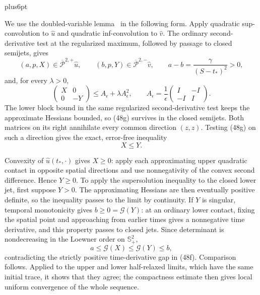 \documentclass[11pt,reqno]{amsart}
\makeatletter
\theoremstyle{plain}
\theoremstyle{definition}
\theoremstyle{remark}
\renewenvironment{proof}[1][\proofname]{%
  \par
  \pushQED{\qed}%
  \normalfont
  \topsep6pt plus6pt\relax
  \trivlist
  \item[\hskip\labelsep\slshape #1\@addpunct{.}]%
  \ignorespaces
}{%
  \popQED
  \endtrivlist
  \@endpefalse
}
\DeclareRobustCommand{\qed}{%
  \leavevmode\unskip\penalty9999\hbox{}\nobreak
  \ifmmode
    \makebox[0pt][l]{\qquad\hbox{\qedsymbol}}%
  \else
    \qquad\hbox{\qedsymbol}%
  \fi
}
\renewcommand{\qedsymbol}{\rule[.47pt]{4pt}{6pt}}
\numberwithin{equation}{section}
\newcommand{\1}{\mathbf 1}
\makeatother
\begin{document}
\begin{proof}
We use the doubled-variable lemma~\cite{CIL1992} in the following form.
Apply quadratic sup-convolution to $\widehat u$ and quadratic
inf-convolution to $\widehat v$.  The ordinary second-derivative test
at the regularized maximum, followed by passage to closed semijets, gives
\begin{equation}
(a,p,X)\in\overline{\mathcal P}^{2,+}\widehat u,\qquad
(b,p,Y)\in\overline{\mathcal P}^{2,-}\widehat v,\qquad
a-b=\frac{\gamma}{(S-t_ *)^2}>0,
\tag{48f}
\end{equation}
and, for every $\lambda>0$,
\begin{equation}
\begin{pmatrix}X&0\\0&-Y\end{pmatrix}
\leq A_ \epsilon+\lambda A_ \epsilon^2,\qquad
A_ \epsilon=\frac1\epsilon
\begin{pmatrix}I&-I\\-I&I\end{pmatrix}.
\tag{48g}
\end{equation}
The lower block bound in the same regularized second-derivative test
keeps the approximate Hessians bounded, so (48g) survives in the
closed semijets.  Both matrices on its right annihilate every common
direction $(z,z)$.  Testing (48g) on such a direction gives the
exact, error-free inequality
\begin{equation}
X\leq Y.
\tag{48h}
\end{equation}

Convexity of $\widehat u(t_ *,\cdot)$ gives $X\geq0$: apply each
approximating upper quadratic contact in opposite spatial directions
and use nonnegativity of the convex second difference.  Hence $Y\geq0$.
To apply the supersolution inequality to the closed lower jet, first
suppose $Y>0$.  The approximating Hessians are then eventually positive
definite, so the inequality passes to the limit by continuity.
If $Y$ is singular, temporal monotonicity gives $b\geq0=\mathcal G(Y)$:
at an ordinary lower contact, fixing the spatial point and approaching
from earlier times gives a nonnegative time derivative, and this
property passes to closed jets.  Since determinant is nondecreasing
in the Loewner order on $\mathbb S_ +^2$,
\begin{equation*}
a\leq \mathcal G(X)\leq \mathcal G(Y)\leq b,
\end{equation*}
contradicting the strictly positive time-derivative gap in (48f).
Comparison follows.  Applied to the upper and lower half-relaxed
limits, which have the same initial trace, it shows that they agree;
the compactness estimate then gives local uniform convergence of the
whole sequence.


\end{proof}
\end{document}

